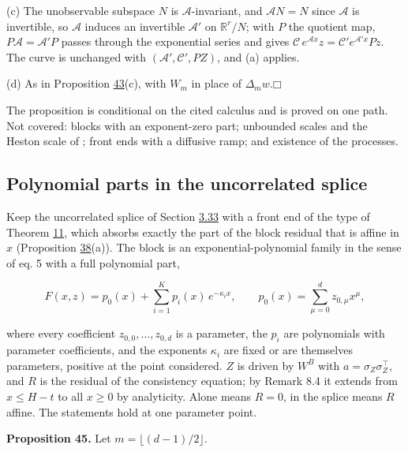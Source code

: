 \documentclass[11pt]{article}
\providecommand{\square}{\mdlgwhtsquare}
\begin{document}
(c) The unobservable subspace \(N\) is \(\mathcal A\)-invariant, and \(\mathcal AN=N\) since \(\mathcal A\) is invertible, so \(\mathcal A\) induces an invertible \(\mathcal A'\) on \(\mathbb R^r/N\); with \(P\) the quotient map, \(P\mathcal A=\mathcal A'P\) passes through the exponential series and gives \(\mathcal C\,e^{\mathcal Ax}z=\mathcal C'e^{\mathcal A'x}Pz\). The curve is unchanged with \((\mathcal A',\mathcal C',PZ)\), and (a) applies.

(d) As in Proposition \hyperref[res:Proposition-43]{43}(c), with \(W_m\) in place of \(\Delta_mw\).\hfill$\square$

The proposition is conditional on the cited calculus and is proved on one path. Not covered: blocks with an exponent-zero part; unbounded scales and the Heston scale of \cite{brace2024sofr}; front ends with a diffusive ramp; and existence of the processes.

\subsection{Polynomial parts in the uncorrelated splice}\label{sec:3.39}

Keep the uncorrelated splice of Section \hyperref[sec:3.33]{3.33} with a front end of the type of Theorem \hyperref[res:Theorem-11]{11}, which absorbs exactly the part of the block residual that is affine in \(x\) (Proposition \hyperref[res:Proposition-38]{38}(a)). The block is an exponential-polynomial family in the sense of \cite{filipovic2000exponential} eq. 5 with a full polynomial part,

\begin{equation*}
F(x,z)=p_0(x)+\sum_{i=1}^Kp_i(x)\,e^{-\kappa_ix},\qquad p_0(x)=\sum_{\mu=0}^dz_{0,\mu}x^\mu, \tag{3.175}\label{eq:3.175}
\end{equation*}

where every coefficient \(z_{0,0},\dots,z_{0,d}\) is a parameter, the \(p_i\) are polynomials with parameter coefficients, and the exponents \(\kappa_i\) are fixed or are themselves parameters, positive at the point considered. \(Z\) is driven by \(W^B\) with \(a=\sigma_Z\sigma_Z^\top\), and \(R\) is the residual of the consistency equation; by \cite{filipovic2000exponential} Remark 8.4 it extends from \(x\le H-t\) to all \(x\ge0\) by analyticity. Alone means \(R=0\), in the splice means \(R\) affine. The statements hold at one parameter point.

\label{res:Proposition-45}
\textbf{Proposition 45.} Let \(m=\lfloor(d-1)/2\rfloor\).
\end{document}
